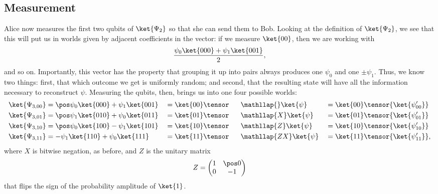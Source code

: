 \subsection{Measurement}\label{sec:measurement}
Alice now measures the first two qubits of $\ket{\Psi_2}$ so that she can send
them to Bob.  Looking at the definition of $\ket{\Psi_2}$, we see that this will
put us in worlds given by adjacent coefficients in the vector: if we measure
$\ket{00}$, then we are working with \[ \frac{\psi_0\ket{000} +
\psi_1\ket{001}}{2}, \] and so on.  Importantly, this vector has the property
that grouping it up into pairs always produces one $\psi_0$ and one
$\pm\psi_1$.  Thus, we know two things: first, that which outcome we get is
uniformly random; and second, that the resulting state will have all the
information necessary to reconstruct $\psi$.  Measuring the qubits, then, brings
us into one four possible worlds:
\begingroup
\def\ZX#1{\hphantom{ZX}\mathllap{#1}}
\begin{alignat*}{3}
  \ket{\Psi_{3,00}}
     &= \pos\psi_0\ket{000} + \psi_1\ket{001}
    &&= \ket{00} \tensor \ZX{  }\ket{\psi}
    &&= \ket{00} \tensor{\ket{\psi'_{00}}} \\
  \ket{\Psi_{3,01}}
     &= \pos\psi_1\ket{010} + \psi_0\ket{011}
    &&= \ket{01} \tensor \ZX{ X}\ket{\psi}
    &&= \ket{01} \tensor{\ket{\psi'_{01}}} \\
  \ket{\Psi_{3,10}}
     &= \pos\psi_0\ket{100} - \psi_1\ket{101}
    &&= \ket{10} \tensor \ZX{Z }\ket{\psi}
    &&= \ket{10} \tensor{\ket{\psi'_{10}}} \\
  \ket{\Psi_{3,11}}
     &=   -\psi_1\ket{110} + \psi_0\ket{111}
    &&= \ket{11} \tensor \ZX{ZX}\ket{\psi}
    &&= \ket{11} \tensor{\ket{\psi'_{11}}},
\end{alignat*}
\endgroup
where $X$ is bitwise negation, as before, and $Z$ is the unitary
matrix \[ Z = \begin{pmatrix} 1 & \pos0 \\ 0 & -1 \end{pmatrix} \] that flips
the sign of the probability amplitude of $\ket{1}$.

